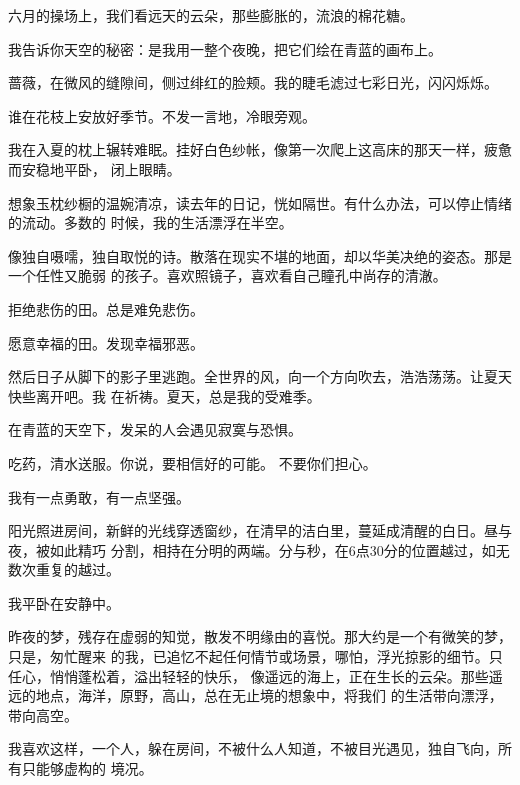	\endwriting



		六月的操场上，我们看远天的云朵，那些膨胀的，流浪的棉花糖。\par
		我告诉你天空的秘密：是我用一整个夜晚，把它们绘在青蓝的画布上。\par
		蔷薇，在微风的缝隙间，侧过绯红的脸颊。我的睫毛滤过七彩日光，闪闪烁烁。

		谁在花枝上安放好季节。不发一言地，冷眼旁观。

		我在入夏的枕上辗转难眠。挂好白色纱帐，像第一次爬上这高床的那天一样，疲惫而安稳地平卧，
	闭上眼睛。

		想象玉枕纱橱的温婉清凉，读去年的日记，恍如隔世。有什么办法，可以停止情绪的流动。多数的
	时候，我的生活漂浮在半空。

		像独自嗫嚅，独自取悦的诗。散落在现实不堪的地面，却以华美决绝的姿态。那是一个任性又脆弱
	的孩子。喜欢照镜子，喜欢看自己瞳孔中尚存的清澈。

		\vspace{1em}
		拒绝悲伤的田。总是难免悲伤。

		愿意幸福的田。发现幸福邪恶。
		\vspace{1em}

		然后日子从脚下的影子里逃跑。全世界的风，向一个方向吹去，浩浩荡荡。让夏天快些离开吧。我
	在祈祷。夏天，总是我的受难季。

		在青蓝的天空下，发呆的人会遇见寂寞与恐惧。

		吃药，清水送服。你说，要相信好的可能。
		不要你们担心。

		我有一点勇敢，有一点坚强。

	\endwriting



		阳光照进房间，新鲜的光线穿透窗纱，在清早的洁白里，蔓延成清醒的白日。昼与夜，被如此精巧
	分割，相持在分明的两端。分与秒，在6点30分的位置越过，如无数次重复的越过。

		我平卧在安静中。

		昨夜的梦，残存在虚弱的知觉，散发不明缘由的喜悦。那大约是一个有微笑的梦，只是，匆忙醒来
	的我，已追忆不起任何情节或场景，哪怕，浮光掠影的细节。只任心，悄悄蓬松着，溢出轻轻的快乐，
	像遥远的海上，正在生长的云朵。那些遥远的地点，海洋，原野，高山，总在无止境的想象中，将我们
	的生活带向漂浮，带向高空。

		我喜欢这样，一个人，躲在房间，不被什么人知道，不被目光遇见，独自飞向，所有只能够虚构的
	境况。

